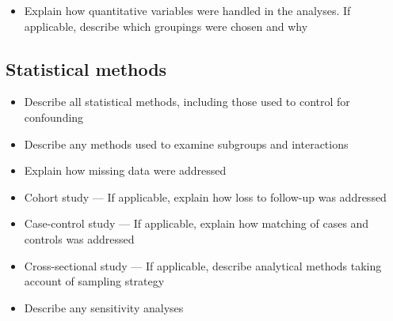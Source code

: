 \documentclass[
  letterpaper,
  DIV=11,
  numbers=noendperiod,
  oneside,
  11pt]{scrartcl}
\providecommand{\tightlist}{%
  \setlength{\itemsep}{0pt}\setlength{\parskip}{0pt}}\usepackage{longtable,booktabs,array}
\begin{document}
\begin{itemize}
\tightlist
\item
  Explain how quantitative variables were handled in the analyses. If
  applicable, describe which groupings were chosen and why
\end{itemize}

\subsection{Statistical methods}\label{statistical-methods}

\begin{itemize}
\tightlist
\item
  Describe all statistical methods, including those used to control for
  confounding
\item
  Describe any methods used to examine subgroups and interactions
\item
  Explain how missing data were addressed
\item
  Cohort study --- If applicable, explain how loss to follow-up was
  addressed
\item
  Case-control study --- If applicable, explain how matching of cases
  and controls was addressed
\item
  Cross-sectional study --- If applicable, describe analytical methods
  taking account of sampling strategy
\item
  Describe any sensitivity analyses
\end{itemize}

\newpage{}


\printbibliography[title=Results]
\end{document}
